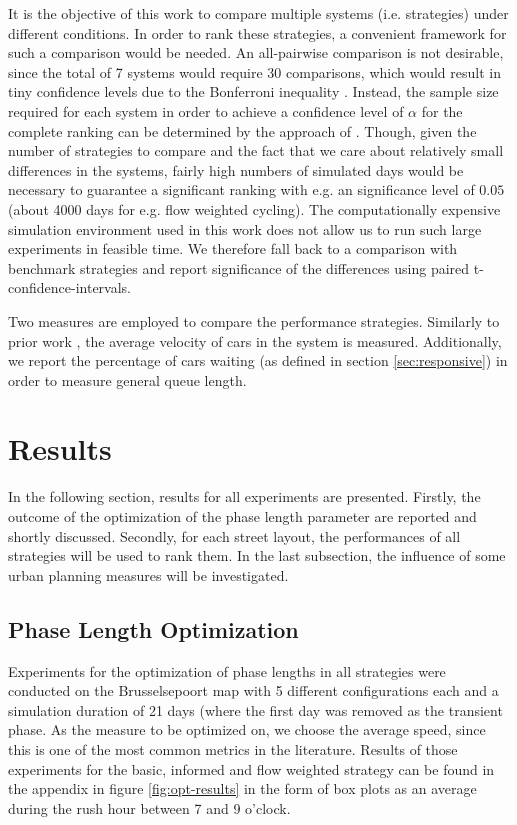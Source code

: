 \documentclass[11pt]{article}
\begin{document}
It is the objective of this work to compare multiple systems (i.e. strategies) under different conditions. In order to rank these strategies, a convenient framework for such a comparison would be needed. An all-pairwise comparison is not desirable, since the total of 7 systems would require 30 comparisons, which would result in tiny confidence levels due to the Bonferroni inequality \citep[see e.g.][]{law2007simulation}. Instead, the sample size required for each system in order to achieve a confidence level of $\alpha$ for the complete ranking can be determined by the approach of \citet{dudewicz1975allocation}. Though, given the number of strategies to compare and the fact that we care about relatively small differences in the systems, fairly high numbers of simulated days would be necessary to guarantee a significant ranking with e.g. an significance level of $0.05$ (about 4000 days for e.g. flow weighted cycling). The computationally expensive simulation environment used in this work does not allow us to run such large experiments in feasible time. We therefore fall back to a comparison with benchmark strategies and report significance of the differences using paired t-confidence-intervals.

Two measures are employed to compare the performance strategies. Similarly to prior work \citep{srinivasan2006neural}, the average velocity of cars in the system is measured. Additionally, we report the percentage of cars waiting (as defined in section \ref{sec:responsive}) in order to measure general queue length.

\section{Results}
\label{sec:results}
In the following section, results for all experiments are presented. Firstly, the outcome of the optimization of the phase length parameter are reported and shortly discussed. Secondly, for each street layout, the performances of all strategies will be used to rank them. In the last subsection, the influence of some urban planning measures will be investigated.

\subsection{Phase Length Optimization}
Experiments for the optimization of phase lengths in all strategies were conducted on the Brusselsepoort map with 5 different configurations each and a simulation duration of 21 days (where the first day was removed as the transient phase. As the measure to be optimized on, we choose the average speed, since this is one of the most common metrics in the literature. Results of those experiments for the basic, informed and flow weighted strategy can be found in the appendix in figure \ref{fig:opt-results} in the form of box plots as an average during the rush hour between 7 and 9 o'clock.
\end{document}
